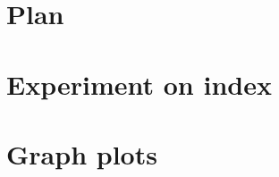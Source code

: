 \documentclass[12pt]{article}
\begin{document}
\section{Plan}
    \label{sec:plan}
    
    
\section{Experiment on index}
    \label{sec:indexexp}
    

\section{Graph plots}
    \label{sec:tengraphplots}
     




\newpage
{}
\tableofcontents
\end{document}

